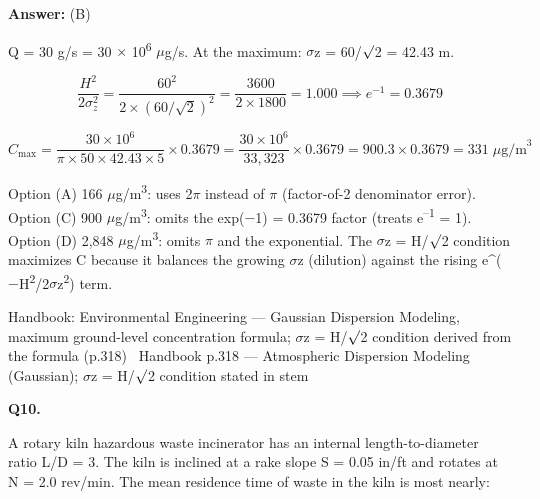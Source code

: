 \documentclass[11pt]{article}
\begin{document}
\vspace{2pt}\par\noindent\colorbox{boxbg}{\parbox{\dimexpr\linewidth-2\fboxsep\relax}{%
\vspace{2pt}\textbf{Answer:} (B)\par\vspace{2pt}
{\small Q = 30 g/s = 30 $\times$ 10\textsuperscript{6} $\mu$g/s. At the maximum: $\sigma$z = 60/$\surd$2 = 42.43 m.

\[\frac{H^2}{2\sigma_z^2} = \frac{60^2}{2\times(60/\sqrt{2})^2} = \frac{3600}{2\times1800} = 1.000 \implies e^{-1} = 0.3679\]

\[C_{\max} = \frac{30\times10^6}{\pi\times50\times42.43\times5}\times0.3679 = \frac{30\times10^6}{33{,}323}\times0.3679 = 900.3\times0.3679 = 331\;\mu\text{g/m}^3\]

Option (A) 166 $\mu$g/m\textsuperscript{3}: uses 2$\pi$ instead of $\pi$ (factor-of-2 denominator error). Option (C) 900 $\mu$g/m\textsuperscript{3}: omits the exp($-$1) = 0.3679 factor (treats e\textsuperscript{--}\textsuperscript{1} = 1). Option (D) 2,848 $\mu$g/m\textsuperscript{3}: omits $\pi$ and the exponential. The $\sigma$z = H/$\surd$2 condition maximizes C because it balances the growing $\sigma$z (dilution) against the rising e\textasciicircum{}($-$H\textsuperscript{2}/2$\sigma$z\textsuperscript{2}) term.}\par\vspace{2pt}
{\footnotesize\color{soft}Handbook: Environmental Engineering --- Gaussian Dispersion Modeling, maximum ground-level concentration formula; $\sigma$z = H/$\surd$2 condition derived from the formula (p.318) \textbullet\ Handbook p.318 --- Atmospheric Dispersion Modeling (Gaussian); $\sigma$z = H/$\surd$2 condition stated in stem}\vspace{2pt}
}}
\vspace{9pt}
\filbreak
\textbf{\color{accent}Q10.}\par\vspace{2pt}
A rotary kiln hazardous waste incinerator has an internal length-to-diameter ratio L/D = 3. The kiln is inclined at a rake slope S = 0.05 in/ft and rotates at N = 2.0 rev/min. The mean residence time of waste in the kiln is most nearly:
\end{document}
